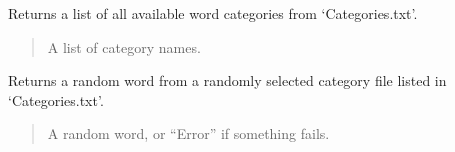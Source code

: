 \documentclass[letterpaper,10pt,english]{sphinxmanual}
\begin{document}

\begin{fulllineitems}
\label{\detokenize{modules:Database_Logic.get_categories}}
\pysigstartsignatures
{}
\pysigstopsignatures
\sphinxAtStartPar
Returns a list of all available word categories from ‘Categories.txt’.
\begin{quote}\begin{description}
\sphinxAtStartPar
A list of category names.

\end{description}\end{quote}

\end{fulllineitems}


\begin{fulllineitems}
\label{\detokenize{modules:Database_Logic.get_random_word}}
\pysigstartsignatures
{}
\pysigstopsignatures
\sphinxAtStartPar
Returns a random word from a randomly selected category file listed in ‘Categories.txt’.
\begin{quote}\begin{description}
\sphinxAtStartPar
A random word, or “Error” if something fails.

\end{description}\end{quote}

\end{fulllineitems}

\end{document}
